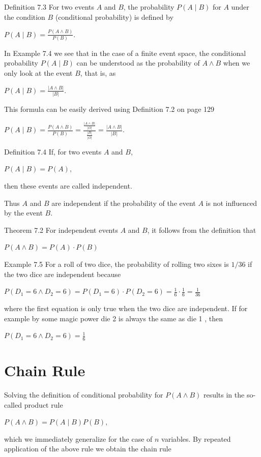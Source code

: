 \documentclass[10pt]{book}
\begin{document}
Definition 7.3 For two events $A$ and $B$, the probability $P(A \mid B)$ for $A$ under the condition $B$ (conditional probability) is defined by

$
P(A \mid B)=\frac{P(A \wedge B)}{P(B)} .
$

In Example 7.4 we see that in the case of a finite event space, the conditional probability $P(A \mid B)$ can be understood as the probability of $A \wedge B$ when we only look at the event $B$, that is, as

$
P(A \mid B)=\frac{|A \wedge B|}{|B|} .
$

This formula can be easily derived using Definition 7.2 on page 129

$
P(A \mid B)=\frac{P(A \wedge B)}{P(B)}=\frac{\frac{|A \wedge B|}{|\Omega|}}{\frac{|B|}{|\Omega|}}=\frac{|A \wedge B|}{|B|} .
$

Definition 7.4 If, for two events $A$ and $B$,

$
P(A \mid B)=P(A),
$

then these events are called independent.

Thus $A$ and $B$ are independent if the probability of the event $A$ is not influenced by the event $B$.

Theorem 7.2 For independent events $A$ and $B$, it follows from the definition that

$
P(A \wedge B)=P(A) \cdot P(B)
$

Example 7.5 For a roll of two dice, the probability of rolling two sixes is $1 / 36$ if the two dice are independent because

$
P\left(D_{1}=6 \wedge D_{2}=6\right)=P\left(D_{1}=6\right) \cdot P\left(D_{2}=6\right)=\frac{1}{6} \cdot \frac{1}{6}=\frac{1}{36}
$

where the first equation is only true when the two dice are independent. If for example by some magic power die 2 is always the same as die 1 , then

$
P\left(D_{1}=6 \wedge D_{2}=6\right)=\frac{1}{6}
$

\section{Chain Rule}
Solving the definition of conditional probability for $P(A \wedge B)$ results in the so-called product rule

$
P(A \wedge B)=P(A \mid B) P(B),
$

which we immediately generalize for the case of $n$ variables. By repeated application of the above rule we obtain the chain rule
\end{document}
